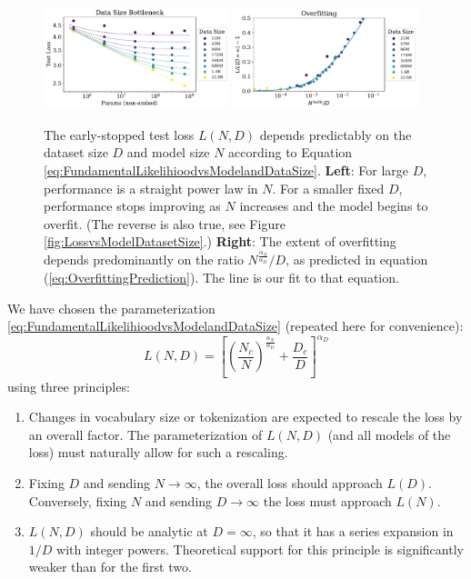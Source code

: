 \documentclass[english]{article}
\newcommand{\be}{\begin{equation}}
\newcommand{\ee}{\end{equation}}
\begin{document}
\begin{figure}
\noindent \centering{} 
\includegraphics[width=0.48\textwidth]{DatasetModelSizevsPerformance}\hfill
\includegraphics[width=0.48\textwidth]{DatasetModelSizevsChangePerformance}
\caption[Universality of overfitting]{
The early-stopped test loss $L(N, D)$ depends predictably on the dataset size $D$ and model size $N$ according to Equation \eqref{eq:FundamentalLikelihioodvsModelandDataSize}.
{\bf Left}:
For large $D$, performance is a straight power law in $N$. For a smaller fixed $D$, performance stops improving as $N$ increases and the model begins to overfit. (The reverse is also true, see Figure \ref{fig:LossvsModelDatasetSize}.)
{\bf Right}:  The extent of overfitting depends predominantly on the ratio $N^{\frac{\alpha_N}{\alpha_D}}/D$, as predicted in equation (\ref{eq:OverfittingPrediction}).  The line is our fit to that equation.
\label{fig:DatasetModelSizevsPerformance}}
\end{figure}

We have chosen the parameterization \eqref{eq:FundamentalLikelihioodvsModelandDataSize} (repeated here for convenience):
\be
L(N, D) 
= \left[ \left( \frac{N_c}{N} \right)^{\frac{\alpha_N}{\alpha_D}} + \frac{D_c}{D}  \right]^{\alpha_D}
\ee
using three principles:
\begin{enumerate}
\item Changes in vocabulary size or tokenization are expected to rescale the loss by an overall factor.  The parameterization of $L(N,D)$ (and all models of the loss) must naturally allow for such a rescaling.
\item Fixing $D$ and sending $N \to \infty$,  the overall loss should approach $L(D)$.  Conversely, fixing $N$ and sending $D \to \infty$ the loss must approach $L(N)$.
\item $L(N,D)$ should be analytic at $D=\infty$, so that it has a series expansion in $1/D$ with integer powers.  Theoretical support for this principle is significantly weaker than for the first two.
\end{enumerate}
\end{document}
